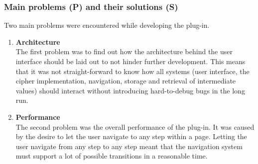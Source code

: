 \subsubsection{Main problems (P) and their solutions (S)}

Two main problems were encountered while developing the plug-in.

\begin{enumerate}[label=(\labelenum{P}{{\arabic*}}), wide, labelwidth=!, labelindent=0pt]
\setlength{\parskip}{0pt}

\item \textbf{Architecture}\\
The first problem was to find out how the architecture behind the user interface should be laid out to not hinder further development. This means that it was not straight-forward to know how all systems (user interface, the cipher implementation, navigation, storage and retrieval of intermediate values) should interact without introducing hard-to-debug bugs in the long run.

\item \textbf{Performance}\\
The second problem was the overall performance of the plug-in. It was caused by the desire to let the user navigate to any step within a page. Letting the user navigate from any step to any step meant that the navigation system must support a lot of possible transitions in a reasonable time.

\end{enumerate}

